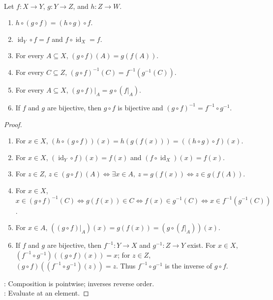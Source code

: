 \begin{proposition} \label{prop:composition-restriction-calculus} \\
Let $f:X\to Y$, $g:Y\to Z$, and $h:Z\to W$.
\begin{enumerate}[label=(\roman*)]
\setlength{\itemsep}{0pt}
\item $h\circ(g\circ f)=(h\circ g)\circ f$.
\item $\operatorname{id}_Y\circ f=f$ and $f\circ\operatorname{id}_X=f$.
\item For every $A\subseteq X$, $(g\circ f)(A)=g(f(A))$.
\item For every $C\subseteq Z$, $(g\circ f)^{-1}(C)=f^{-1}(g^{-1}(C))$.
\item For every $A\subseteq X$, $(g\circ f)|_A=g\circ(f|_A)$.
\item If $f$ and $g$ are bijective, then $g\circ f$ is bijective and $(g\circ f)^{-1}=f^{-1}\circ g^{-1}$.
\end{enumerate}
\begin{proof}
\begin{enumerate}[label=(\roman*)]
\setlength{\itemsep}{0pt}
\item For $x\in X$, $(h\circ(g\circ f))(x)=h(g(f(x)))=((h\circ g)\circ f)(x)$.
\item For $x\in X$, $(\operatorname{id}_Y\circ f)(x)=f(x)$ and $(f\circ\operatorname{id}_X)(x)=f(x)$.
\item For $z\in Z$, $z\in(g\circ f)(A)\Longleftrightarrow\exists x\in A,\ z=g(f(x))\Longleftrightarrow z\in g(f(A))$.
\item For $x\in X$, $x\in(g\circ f)^{-1}(C)\Longleftrightarrow g(f(x))\in C\Longleftrightarrow f(x)\in g^{-1}(C)\Longleftrightarrow x\in f^{-1}(g^{-1}(C))$.
\item For $x\in A$, $((g\circ f)|_A)(x)=g(f(x))=(g\circ(f|_A))(x)$.
\item If $f$ and $g$ are bijective, then $f^{-1}:Y\to X$ and $g^{-1}:Z\to Y$ exist. For $x\in X$, $(f^{-1}\circ g^{-1})((g\circ f)(x))=x$; for $z\in Z$, $(g\circ f)((f^{-1}\circ g^{-1})(z))=z$. Thus $f^{-1}\circ g^{-1}$ is the inverse of $g\circ f$.
\end{enumerate}
: Composition is pointwise; inverses reverse order.\\
: Evaluate at an element.
\end{proof}
\end{proposition}
